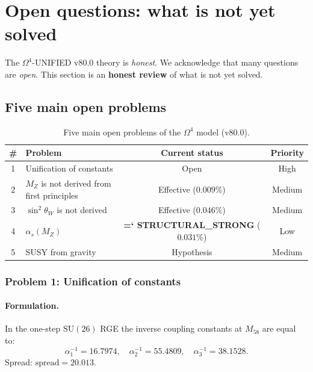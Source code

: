 \documentclass[11pt,a4paper]{article}
\newcommand{\SU}{\mathrm{SU}}
\newcommand{\Om}{\Omega^4}
\renewcommand{\texttt}[1]{{\ttfamily\hyphenchar\font=`\- #1}}
\theoremstyle{definition}
\begin{document}
\section{Open questions: what is not yet solved}
\label{sec:open}

The $\Om$-UNIFIED v80.0 theory is \emph{honest}. We acknowledge that 
many questions are \emph{open}. This section is an \textbf{honest 
review} of what is not yet solved.

\subsection{Five main open problems}
\label{subsec:five-open}

\begin{table}[htbp]
\centering
\caption{Five main open problems of the $\Om$ model (v80.0).}
\label{tab:five-open-problems}
\begin{tabular}{clcc}
\toprule
\# & Problem & Current status & Priority \\
\midrule
1 & Unification of constants & Open & High \\
2 & $M_Z$ is not derived from first principles & 
    Effective ($0.009\%$) & Medium \\
3 & $\sin^2\theta_W$ is not derived & 
    Effective ($0.046\%$) & Medium \\
4 & $\alpha_s(M_Z)$ & 
    \textbf{\texttt{STRUCTURAL\_STRONG}} ($0.031\%$) & Low \\
5 & SUSY from gravity & Hypothesis & Medium \\
\bottomrule
\end{tabular}
\end{table}
   
\subsubsection{Problem 1: Unification of constants}

\paragraph{Formulation.}
In the one-step $\SU(26)$ RGE the inverse coupling constants at 
$M_{58}$ are equal to:
\begin{equation}
    \alpha_1^{-1} = 16.7974, \quad
    \alpha_2^{-1} = 55.4809, \quad
    \alpha_3^{-1} = 38.1528.
\end{equation}
Spread: $\text{spread} = 20.013$.
\end{document}
